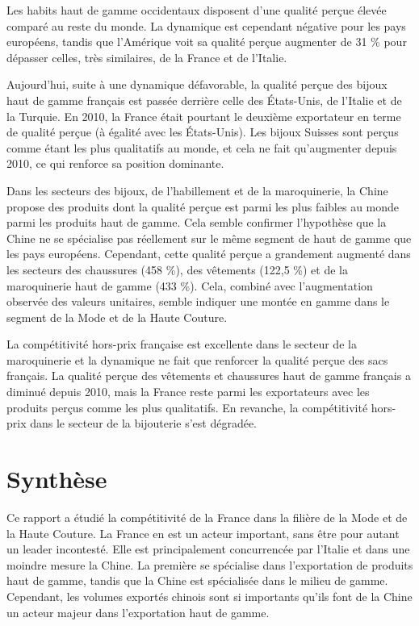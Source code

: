 \documentclass[french,10pt,a4paper]{article}
\begin{document}
Les habits haut de gamme occidentaux disposent d'une qualité perçue élevée comparé au reste du monde. La dynamique est cependant négative pour les pays européens, tandis que l'Amérique voit sa qualité perçue augmenter de 31 \% pour dépasser celles, très similaires, de la France et de l'Italie.

Aujourd'hui, suite à une dynamique défavorable, la qualité perçue des bijoux haut de gamme français est passée derrière celle des États-Unis, de l'Italie et de la Turquie. En 2010, la France était pourtant le deuxième exportateur en terme de qualité perçue (à égalité avec les États-Unis). Les bijoux Suisses sont perçus comme étant les plus qualitatifs au monde, et cela ne fait qu'augmenter depuis 2010, ce qui renforce sa position dominante.

Dans les secteurs des bijoux, de l'habillement et de la maroquinerie, la Chine propose des produits dont la qualité perçue est parmi les plus faibles au monde parmi les produits haut de gamme. Cela semble confirmer l'hypothèse que la Chine ne se spécialise pas réellement sur le même segment de haut de gamme que les pays européens. Cependant, cette qualité perçue a grandement augmenté dans les secteurs des chaussures (458 \%), des vêtements (122,5 \%) et de la maroquinerie haut de gamme (433 \%). Cela, combiné avec l'augmentation observée des valeurs unitaires, semble indiquer une montée en gamme dans le segment de la Mode et de la Haute Couture.

\bigskip

La compétitivité hors-prix française est excellente dans le secteur de la maroquinerie et la dynamique ne fait que renforcer la qualité perçue des sacs français. La qualité perçue des vêtements et chaussures haut de gamme français a diminué depuis 2010, mais la France reste parmi les exportateurs avec les produits perçus comme les plus qualitatifs. En revanche, la compétitivité hors-prix dans le secteur de la bijouterie s'est dégradée.





\newpage
\section{Synthèse}

Ce rapport a étudié la compétitivité de la France dans la filière de la Mode et de la Haute Couture. La France en est un acteur important, sans être pour autant un leader incontesté. Elle est principalement concurrencée par l'Italie et dans une moindre mesure la Chine. La première se spécialise dans l'exportation de produits haut de gamme, tandis que la Chine est spécialisée dans le milieu de gamme. Cependant, les volumes exportés chinois sont si importants qu'ils font de la Chine un acteur majeur dans l'exportation haut de gamme.
\end{document}
